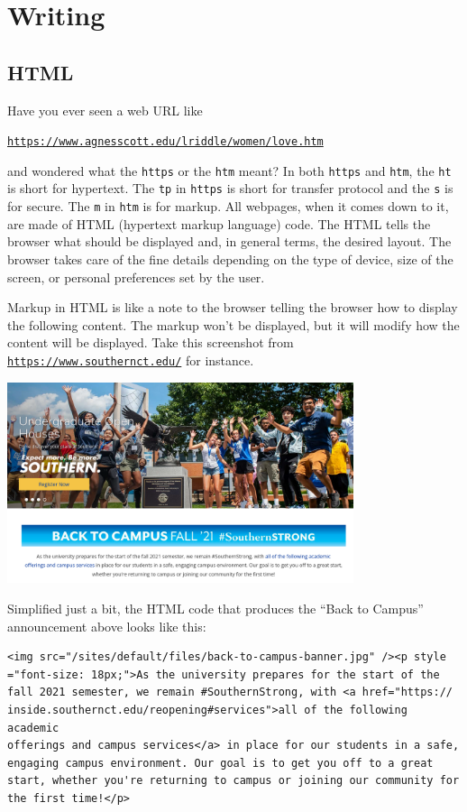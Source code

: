 
\chapter{Writing}

\section{HTML}
\label{sec:html}

Have you ever seen a web URL like 
\begin{center}
\href{https://www.agnesscott.edu/lriddle/women/love.htm}{\tt https://www.agnesscott.edu/lriddle/women/love.htm}
\end{center}

\noindent and wondered what the \texttt{https} or the \texttt{htm}
meant? In both \texttt{https} and \texttt{htm}, the \texttt{ht} is
short for hypertext. The \texttt{tp} in \texttt{https} is short for
transfer protocol and the \texttt{s} is for secure. The \texttt{m}
in \texttt{htm} is for markup. All webpages, when it comes down to
it, are made of HTML (hypertext markup language) code. The HTML tells
the browser what should be displayed and, in general terms, the desired
layout. The browser takes care of the fine details depending on the
type of device, size of the screen, or personal preferences set by
the user.

Markup in HTML is like a note to the browser telling the browser how
to display the following content. The markup won't be displayed, but
it will modify how the content will be displayed. Take this screenshot
from \texttt{\href{https://www.southernct.edu/}{https://www.southernct.edu/}}
for instance.
\begin{center}
\includegraphics[width=4in]{write/SCSUscreenshot}
\par\end{center}

\noindent Simplified just a bit, the HTML code that produces the ``Back
to Campus'' announcement above looks like this:
\begin{verbatim}
<img src="/sites/default/files/back-to-campus-banner.jpg" /><p style
="font-size: 18px;">As the university prepares for the start of the
fall 2021 semester, we remain #SouthernStrong, with <a href="https://
inside.southernct.edu/reopening#services">all of the following academic
offerings and campus services</a> in place for our students in a safe,
engaging campus environment. Our goal is to get you off to a great
start, whether you're returning to campus or joining our community for
the first time!</p>
\end{verbatim}


